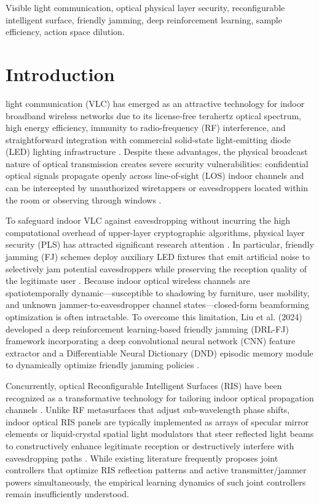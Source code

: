 \documentclass[journal,10pt,twocolumn]{IEEEtran}
\begin{document}
\begin{IEEEkeywords}
Visible light communication, optical physical layer security, reconfigurable intelligent surface, friendly jamming, deep reinforcement learning, sample efficiency, action space dilution.
\end{IEEEkeywords}

\section{Introduction}
 light communication (VLC) has emerged as an attractive technology for indoor broadband wireless networks due to its license-free terahertz optical spectrum, high energy efficiency, immunity to radio-frequency (RF) interference, and straightforward integration with commercial solid-state light-emitting diode (LED) lighting infrastructure \cite{abdelhady2020visible, pathak2015visible}. Despite these advantages, the physical broadcast nature of optical transmission creates severe security vulnerabilities: confidential optical signals propagate openly across line-of-sight (LOS) indoor channels and can be intercepted by unauthorized wiretappers or eavesdroppers located within the room or observing through windows \cite{liu2024smart}.

To safeguard indoor VLC against eavesdropping without incurring the high computational overhead of upper-layer cryptographic algorithms, physical layer security (PLS) has attracted significant research attention \cite{bloch2008wireless, barros2006secrecy}. In particular, friendly jamming (FJ) schemes deploy auxiliary LED fixtures that emit artificial noise to selectively jam potential eavesdroppers while preserving the reception quality of the legitimate user \cite{liu2024smart}. Because indoor optical wireless channels are spatiotemporally dynamic---susceptible to shadowing by furniture, user mobility, and unknown jammer-to-eavesdropper channel states---closed-form beamforming optimization is often intractable. To overcome this limitation, Liu et al. (2024) developed a deep reinforcement learning-based friendly jamming (DRL-FJ) framework incorporating a deep convolutional neural network (CNN) feature extractor and a Differentiable Neural Dictionary (DND) episodic memory module to dynamically optimize friendly jamming policies \cite{liu2024smart, pritchard2017neural, mnih2015human}.

Concurrently, optical Reconfigurable Intelligent Surfaces (RIS) have been recognized as a transformative technology for tailoring indoor optical propagation channels \cite{qian2021reconfigurable, sun2022ris}. Unlike RF metasurfaces that adjust sub-wavelength phase shifts, indoor optical RIS panels are typically implemented as arrays of specular mirror elements or liquid-crystal spatial light modulators that steer reflected light beams to constructively enhance legitimate reception or destructively interfere with eavesdropping paths \cite{qian2021reconfigurable}. While existing literature frequently proposes joint controllers that optimize RIS reflection patterns and active transmitter/jammer powers simultaneously, the empirical learning dynamics of such joint controllers remain insufficiently understood.
\end{document}
